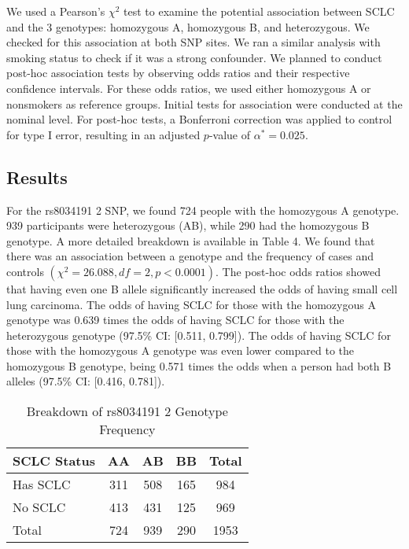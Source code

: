\documentclass{article}
\begin{document}
	We used a Pearson’s $\chi^2$ test to examine the potential association between SCLC and the 3 genotypes: homozygous A, homozygous B, and heterozygous. We checked for this association at both SNP sites. We ran a similar analysis with smoking status to check if it was a strong confounder. We planned to conduct post-hoc association tests by observing odds ratios and their respective confidence intervals. For these odds ratios, we used either homozygous A or nonsmokers as reference groups. Initial tests for association were conducted at the nominal level. For post-hoc tests, a Bonferroni correction was applied to control for type I error, resulting in an adjusted $p$-value of $\alpha^* = 0.025$.

	\subsection*{Results}
	For the rs8034191 2 SNP, we found 724 people with the homozygous A genotype. 939 participants were heterozygous (AB), while 290 had the homozygous B genotype. A more detailed breakdown is available in Table 4. We found that there was an association between a genotype and the frequency of cases and controls $(\chi^2 = 26.088, df = 2, p < 0.0001)$. The post-hoc odds ratios showed that having even one B allele significantly increased the odds of having small cell lung carcinoma. The odds of having SCLC for those with the homozygous A genotype was 0.639 times the odds of having SCLC for those with the heterozygous genotype (97.5\% CI: [0.511, 0.799]). The odds of having SCLC for those with the homozygous A genotype was even lower compared to the homozygous B genotype, being 0.571 times the odds when a person had both B alleles (97.5\% CI: [0.416, 0.781]).

	\begin{table}[h]
		\centering
		\footnotesize
		\renewcommand{\arraystretch}{1.2}
		\begin{tabular}{l c c c c}
			\toprule
			\textbf{SCLC Status} & \textbf{AA} & \textbf{AB} & \textbf{BB} & \textbf{Total} \\
			\midrule
			Has SCLC & 311 & 508 & 165 & 984 \\
			No SCLC & 413 & 431 & 125 & 969 \\
			\midrule
			Total & 724 & 939 & 290 & 1953 \\
			\bottomrule
		\end{tabular}
		\caption{Breakdown of rs8034191 2 Genotype Frequency}
		\label{tab:genotype_frequency}
	\end{table}
\end{document}
